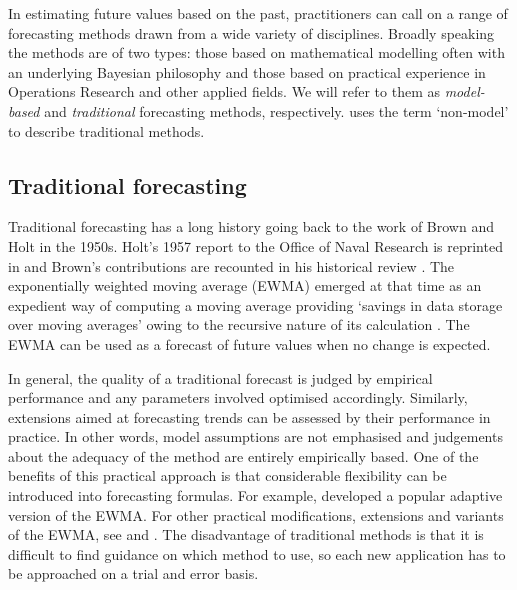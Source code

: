 In estimating future values based on the past, practitioners can call on a range of forecasting methods drawn from a wide variety of disciplines.  Broadly speaking the methods are of two types: those based on mathematical modelling often with an underlying Bayesian philosophy and those based on practical experience in Operations Research and other applied fields.  We will refer to them as \emph{model-based} and \emph{traditional} forecasting methods, respectively.  \citet{shephard2015martingale} uses the term `non-model' to describe traditional methods. 

\subsection{Traditional forecasting}
Traditional forecasting has a long history going back to the work of Brown and Holt in the 1950s. Holt's  1957 report to the Office of Naval Research is reprinted in \citet{holt2004forecasting} and Brown's contributions are recounted in his historical review \citep{brown2004smoothing}. The exponentially weighted moving average (EWMA) emerged at that time as an expedient way of computing a moving average providing `savings in data storage over moving averages' owing to the recursive nature of its calculation \citep{gardner2006exponential}. The EWMA can be used as a forecast of future values when no change is expected. 

In general, the quality of a traditional forecast is judged by empirical performance and any parameters involved optimised accordingly. Similarly, extensions aimed at forecasting trends can be assessed by their performance in practice.  In other words, model assumptions are not emphasised and judgements about the adequacy of the method are entirely empirically based. One of the benefits of this practical approach is that considerable flexibility can be introduced into forecasting formulas.  For example, \citet{trigg1995exponential}  developed a popular adaptive version  of the EWMA. For other practical modifications, extensions and variants of the EWMA, see \citet{brown2004smoothing} and \citet{gardner2006exponential}. The disadvantage of traditional methods is that it is difficult to find guidance on which method to use, so each new application has to be approached on a trial and error basis. 


